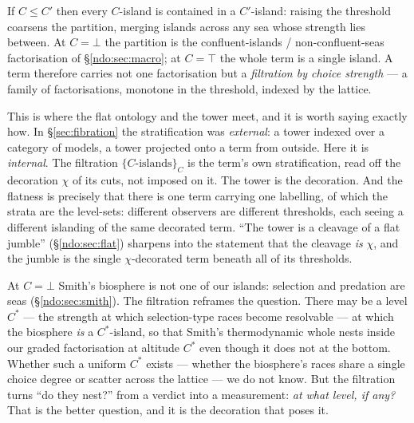 \begin{proposition}\label{ndo:prop:filtration}
If $C \le C'$ then every $C$-island is contained in a $C'$-island: raising the threshold coarsens
the partition, merging islands across any sea whose strength lies between. At $C = \bot$ the
partition is the confluent-islands / non-confluent-seas factorisation of \S\ref{ndo:sec:macro}; at
$C = \top$ the whole term is a single island. A term therefore carries not one factorisation but a
\emph{filtration by choice strength} --- a family of factorisations, monotone in the threshold,
indexed by the lattice.
\end{proposition}

This is where the flat ontology and the tower meet, and it is worth saying exactly how. In
\S\ref{sec:fibration} the stratification was \emph{external}: a tower indexed over a category of models,
a tower projected onto a term from outside. Here it is \emph{internal}. The filtration
$\{C\text{-islands}\}_{C}$ is the term's own stratification, read off the decoration $\chi$ of its
cuts, not imposed on it. The tower is the decoration. And the flatness is precisely that there is
one term carrying one labelling, of which the strata are the level-sets: different observers are
different thresholds, each seeing a different islanding of the same decorated term. ``The tower is a
cleavage of a flat jumble'' (\S\ref{ndo:sec:flat}) sharpens into the statement that the cleavage
\emph{is} $\chi$, and the jumble is the single $\chi$-decorated term beneath all of its thresholds.

\begin{remark}\label{ndo:rmk:nest}
At $C = \bot$ Smith's biosphere is not one of our islands: selection and predation are seas
(\S\ref{ndo:sec:smith}). The filtration reframes the question. There may be a level $C^{*}$ --- the
strength at which selection-type races become resolvable --- at which the biosphere \emph{is} a
$C^{*}$-island, so that Smith's thermodynamic whole nests inside our graded factorisation at
altitude $C^{*}$ even though it does not at the bottom. Whether such a uniform $C^{*}$ exists ---
whether the biosphere's races share a single choice degree or scatter across the lattice --- we do
not know. But the filtration turns ``do they nest?'' from a verdict into a measurement: \emph{at
what level, if any?} That is the better question, and it is the decoration that poses it.
\end{remark}

